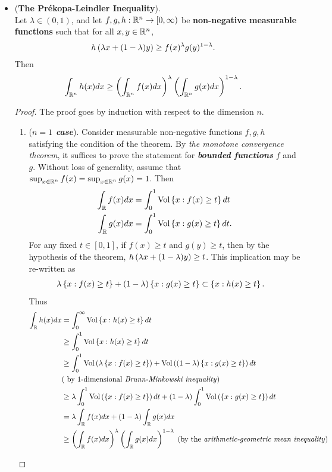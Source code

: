 \documentclass[11pt]{article}
\begin{document}
\begin{itemize}
\item \begin{theorem} (\textbf{The Pr{\'e}kopa-Leindler Inequality}). \citep{boucheron2013concentration, wainwright2019high} \\
Let $\lambda \in (0, 1)$, and let $f, g, h : {\mathbb R}^n \to [0, \infty)$ be \textbf{non-negative measurable functions} such that for all $x, y \in {\mathbb R}^n$,
\begin{align*}
h\left(\lambda x + (1- \lambda) y\right) &\ge f(x)^{\lambda}g(y)^{1-\lambda}.
\end{align*} Then
\begin{align}
\int_{{\mathbb R}^n} h(x) dx &\ge \left(\int_{{\mathbb R}^n} f(x) dx \right)^{\lambda}\left(\int_{{\mathbb R}^n} g(x) dx\right)^{1-\lambda}.   \label{ineqn: prekopa_leindler_inequality}
\end{align}
\end{theorem}
\begin{proof}
The proof goes by induction with respect to the dimension $n$.
\begin{enumerate}
\item (\textbf{\emph{$n=1$ case}}). Consider measurable non-negative functions $f, g, h$ satisfying the condition of the theorem. By \emph{the monotone convergence theorem}, it suffices to prove the statement for \emph{\textbf{bounded functions}} $f$ and $g$.  Without loss of generality, assume that  $\sup_{x\in {\mathbb R}^n} f(x) = \sup_{x\in {\mathbb R}^n} g(x) = 1$.  Then
\begin{align*}
\int_{{\mathbb R}} f(x) dx &= \int_{0}^{1}\text{Vol}\left\{x: f(x) \ge t\right\} dt \\
\int_{{\mathbb R}} g(x) dx &= \int_{0}^{1}\text{Vol}\left\{x: g(x) \ge t\right\} dt.
\end{align*} For any fixed $t \in [0, 1]$, if $f(x) \ge t$ and $g(y) \ge t$, then by the hypothesis of the theorem, $h\left(\lambda x + (1- \lambda) y\right) \ge t$. This implication may be re-written as
\begin{align*}
\lambda\left\{x: f(x) \ge t\right\} + (1- \lambda) \left\{x: g(x) \ge t\right\} &\subset \left\{x: h(x) \ge t\right\}.
\end{align*} Thus
\begin{align*}
\int_{{\mathbb R}} h(x) dx &= \int_{0}^{\infty}\text{Vol}\left\{x: h(x) \ge t\right\} dt \\
&\ge  \int_{0}^{1}\text{Vol}\left\{x: h(x) \ge t\right\} dt \\
&\ge \int_{0}^{1} \text{Vol}\left(\lambda\left\{x: f(x) \ge t\right\}\right) + \text{Vol}\left((1- \lambda) \left\{x: g(x) \ge t\right\}\right) dt \\
& (\text{ by $1$-dimensional \emph{Brunn-Minkowski inequality}}) \\
&\ge \lambda \int_{0}^{1}\text{Vol}\left(\left\{x: f(x) \ge t\right\}\right)dt + (1- \lambda)\int_{0}^{1}\text{Vol}\left( \left\{x: g(x) \ge t\right\}\right)dt \\
& =\lambda   \int_{{\mathbb R}} f(x) dx  + (1- \lambda) \int_{{\mathbb R}} g(x) dx \\
&\ge \left(\int_{{\mathbb R}} f(x) dx \right)^{\lambda}\left(\int_{{\mathbb R}} g(x) dx\right)^{1-\lambda} \; \text{(by the \emph{arithmetic-geometric mean inequality})}
\end{align*}


\end{enumerate}
\end{proof}
\end{itemize}
\end{document}
